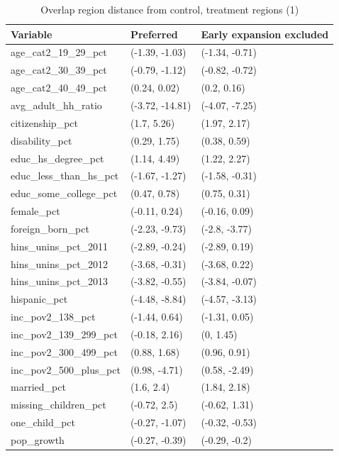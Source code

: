 \begin{table}[ht]
\centering
    \caption{Overlap region distance from control, treatment regions (1)}
    \label{tab:oatedist1}
\begin{tabular}{lll}
  \toprule
Variable & Preferred & Early expansion excluded \\ 
  \midrule
age\_cat2\_19\_29\_pct & (-1.39, -1.03) & (-1.34, -0.71) \\ 
  age\_cat2\_30\_39\_pct & (-0.79, -1.12) & (-0.82, -0.72) \\ 
  age\_cat2\_40\_49\_pct & (0.24, 0.02) & (0.2, 0.16) \\ 
  avg\_adult\_hh\_ratio & (-3.72, -14.81) & (-4.07, -7.25) \\ 
  citizenship\_pct & (1.7, 5.26) & (1.97, 2.17) \\ 
  disability\_pct & (0.29, 1.75) & (0.38, 0.59) \\ 
  educ\_hs\_degree\_pct & (1.14, 4.49) & (1.22, 2.27) \\ 
  educ\_less\_than\_hs\_pct & (-1.67, -1.27) & (-1.58, -0.31) \\ 
  educ\_some\_college\_pct & (0.47, 0.78) & (0.75, 0.31) \\ 
  female\_pct & (-0.11, 0.24) & (-0.16, 0.09) \\ 
  foreign\_born\_pct & (-2.23, -9.73) & (-2.8, -3.77) \\ 
  hins\_unins\_pct\_2011 & (-2.89, -0.24) & (-2.89, 0.19) \\ 
  hins\_unins\_pct\_2012 & (-3.68, -0.31) & (-3.68, 0.22) \\ 
  hins\_unins\_pct\_2013 & (-3.82, -0.55) & (-3.84, -0.07) \\ 
  hispanic\_pct & (-4.48, -8.84) & (-4.57, -3.13) \\ 
  inc\_pov2\_138\_pct & (-1.44, 0.64) & (-1.31, 0.05) \\ 
  inc\_pov2\_139\_299\_pct & (-0.18, 2.16) & (0, 1.45) \\ 
  inc\_pov2\_300\_499\_pct & (0.88, 1.68) & (0.96, 0.91) \\ 
  inc\_pov2\_500\_plus\_pct & (0.98, -4.71) & (0.58, -2.49) \\ 
  married\_pct & (1.6, 2.4) & (1.84, 2.18) \\ 
  missing\_children\_pct & (-0.72, 2.5) & (-0.62, 1.31) \\ 
  one\_child\_pct & (-0.27, -1.07) & (-0.32, -0.53) \\ 
  pop\_growth & (-0.27, -0.39) & (-0.29, -0.2) \\ 

\end{tabular}
\end{table}
